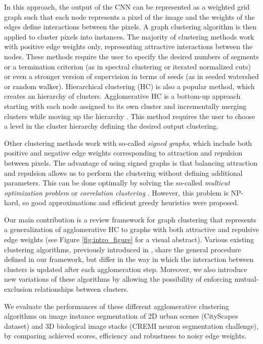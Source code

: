 In this approach, the output of the CNN can be represented as a weighted grid graph such that each node represents a pixel of the image and the weights of the edges define interactions between the pixels. A graph clustering algorithm is then applied to cluster pixels into instances. The majority of clustering methods work with positive edge weights only, representing attractive interactions between the nodes. These methods require the user to specify the desired numbers of segments or a termination criterion (as in spectral clustering or iterated normalized cuts) or even a stronger version of supervision in terms of seeds (as in seeded watershed or random walker).  
Hierarchical clustering (HC) is also a popular method, which creates an hierarchy of clusters. Agglomerative HC is a bottom-up approach starting with each node assigned to its own cluster and incrementally merging clusters while moving up the hierarchy \cite{lance1967general}. This method requires the user to choose a level in the cluster hierarchy defining the desired output clustering. 

Other clustering methods work with so-called \emph{signed graphs}, which include both positive and negative edge weights corresponding to attraction and repulsion between pixels. The advantage of using signed graphs is that balancing attraction and repulsion allows us to perform the clustering without defining additional parameters. This can be done optimally by solving the so-called \emph{multicut optimization problem} or \emph{correlation clustering} \cite{kappes2011globally,chopra1991multiway}. However, this problem is NP-hard, so good approximations \cite{yarkony2012fast,pape2017solving} and efficient greedy heuristics \cite{levinkov2017comparative,wolf2018mutex} were proposed.

Our main contribution is a review framework for graph clustering that represents a generalization of agglomerative HC to graphs with both attractive and repulsive edge weights (see Figure \ref{fig:intro_figure} for a visual abstract). 
Various existing clustering algorithms, previously introduced in \cite{levinkov2017comparative,wolf2018mutex,kardoostsolving,lance1967general}, share the general procedure defined in our framework, but differ in the way in which the interaction between clusters is updated after each agglomeration step. Moreover, we also introduce new variations of these algorithms by allowing the possibility of enforcing mutual-exclusion relationships between clusters.  

We evaluate the performances of these different agglomerative clustering algorithms on image instance segmentation of 2D urban scenes (CityScapes dataset) and 3D biological image stacks (CREMI neuron segmentation challenge), by comparing achieved scores, efficiency and robustness to noisy edge weights. 




